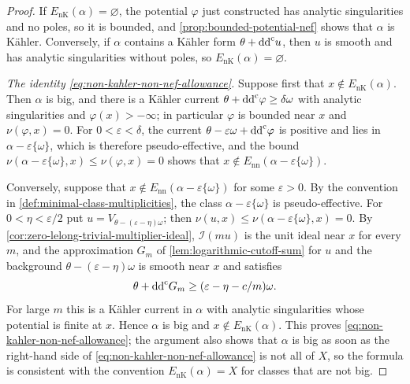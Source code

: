 \begin{proof}
If $E_{\mathrm{nK}}(\alpha)=\varnothing$, the potential $\varphi$ just constructed has analytic singularities and no poles, so it is bounded, and \cref{prop:bounded-potential-nef} shows that $\alpha$ is K\"ahler. Conversely, if $\alpha$ contains a K\"ahler form $\theta+\mathrm{dd}^{\mathrm{c}} u$, then $u$ is smooth and has analytic singularities without poles, so $E_{\mathrm{nK}}(\alpha)=\varnothing$.

\emph{The identity \eqref{eq:non-kahler-non-nef-allowance}.} Suppose first that $x\notin E_{\mathrm{nK}}(\alpha)$. Then $\alpha$ is big, and there is a K\"ahler current $\theta+\mathrm{dd}^{\mathrm{c}}\varphi\geq\delta\omega$ with analytic singularities and $\varphi(x)>-\infty$; in particular $\varphi$ is bounded near $x$ and $\nu(\varphi,x)=0$. For $0<\varepsilon<\delta$, the current $\theta-\varepsilon\omega+\mathrm{dd}^{\mathrm{c}}\varphi$ is positive and lies in $\alpha-\varepsilon\{\omega\}$, which is therefore pseudo-effective, and the bound $\nu(\alpha-\varepsilon\{\omega\},x)\leq\nu(\varphi,x)=0$ shows that $x\notin E_{\mathrm{nn}}(\alpha-\varepsilon\{\omega\})$.

Conversely, suppose that $x\notin E_{\mathrm{nn}}(\alpha-\varepsilon\{\omega\})$ for some $\varepsilon>0$. By the convention in \cref{def:minimal-class-multiplicities}, the class $\alpha-\varepsilon\{\omega\}$ is pseudo-effective. For $0<\eta<\varepsilon/2$ put $u=V_{\theta-(\varepsilon-\eta)\omega}$; then $\nu(u,x)\leq\nu(\alpha-\varepsilon\{\omega\},x)=0$. By \cref{cor:zero-lelong-trivial-multiplier-ideal}, $\mathcal I(mu)$ is the unit ideal near $x$ for every $m$, and the approximation $G_m$ of \cref{lem:logarithmic-cutoff-sum} for $u$ and the background $\theta-(\varepsilon-\eta)\omega$ is smooth near $x$ and satisfies
\[
 \theta+\mathrm{dd}^{\mathrm{c}} G_m\geq(\varepsilon-\eta-c/m)\omega.
\]
For large $m$ this is a K\"ahler current in $\alpha$ with analytic singularities whose potential is finite at $x$. Hence $\alpha$ is big and $x\notin E_{\mathrm{nK}}(\alpha)$. This proves \eqref{eq:non-kahler-non-nef-allowance}; the argument also shows that $\alpha$ is big as soon as the right-hand side of \eqref{eq:non-kahler-non-nef-allowance} is not all of $X$, so the formula is consistent with the convention $E_{\mathrm{nK}}(\alpha)=X$ for classes that are not big.
\end{proof}

